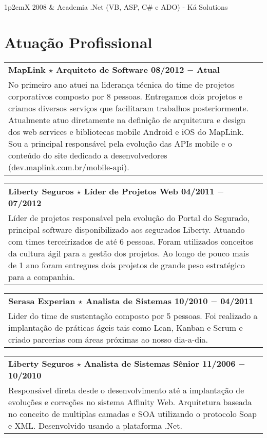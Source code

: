 \documentclass[a4paper, oneside, final]{scrartcl}
\newcommand{\vspc}{\vspace{0.15cm}} %
\begin{document}
\begin{center}
\begin{tabularx}{1\linewidth}{p{2cm}X}
2008       & Academia .Net (VB, ASP, C\# e ADO) - Ká Solutions 
\end{tabularx}


\section{Atuação Profissional}
\begin{tabularx}{1\linewidth}{X}
{\bf MapLink $\star$ Arquiteto de Software \hfill 08/2012 $-$ Atual} \\
No primeiro ano atuei na liderança técnica do time de projetos corporativos composto por 8 pessoas. Entregamos dois projetos e criamos diversos serviços que facilitaram trabalhos posteriormente. Atualmente atuo diretamente na definição de arquitetura e design dos web services e bibliotecas mobile Android e iOS do MapLink. Sou a principal responsável pela evolução das APIs mobile e o conteúdo do site dedicado a desenvolvedores (dev.maplink.com.br/mobile-api). \vspc\\
\end{tabularx}

\begin{tabularx}{1\linewidth}{X}
{\bf Liberty Seguros $\star$ Líder de Projetos Web \hfill 04/2011 $-$ 07/2012} \\
Líder de projetos responsável pela evolução do Portal do Segurado, principal software disponibilizado aos segurados Liberty. Atuando com times terceirizados de até 6 pessoas. Foram utilizados conceitos da cultura ágil para a gestão dos projetos. Ao longo de pouco mais de 1 ano foram entregues dois projetos de grande peso estratégico para a companhia.\vspc\\
\end{tabularx}

\begin{tabularx}{1\linewidth}{X}
{\bf Serasa Experian $\star$  Analista de Sistemas \hfill 10/2010 $-$ 04/2011} \\
Lider do time de sustentação composto por 5 pessoas. Foi realizado a implantação de práticas ágeis tais como Lean, Kanban e Scrum e criado parcerias com áreas próximas ao nosso dia-a-dia.\vspc\\
\end{tabularx}

\begin{tabularx}{1\linewidth}{X}
{\bf Liberty Seguros $\star$ Analista de Sistemas Sênior \hfill 11/2006 $-$ 10/2010} \\
Responsável direta desde o desenvolvimento até a implantação de evoluções e correções no sistema Affinity Web. Arquitetura baseada no conceito de multiplas camadas e SOA utilizando o protocolo Soap e XML. Desenvolvido usando a plataforma .Net.\vspc\\
\end{tabularx}


\end{center}
\end{document}
